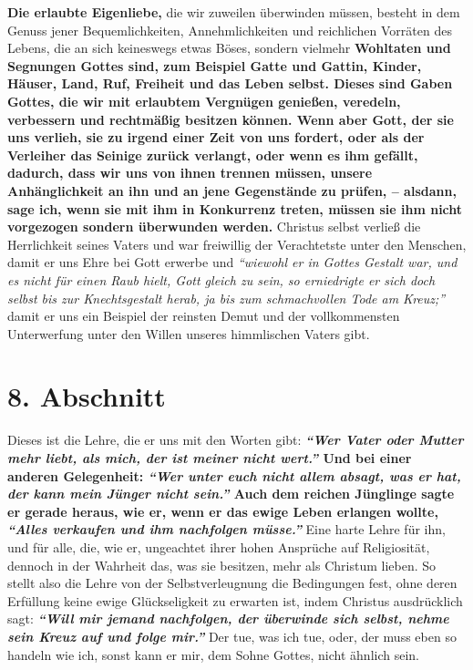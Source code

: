 \label{ref:04_07_vorteile}
\textbf{Die erlaubte Eigenliebe,} die wir zuweilen
überwinden müssen,
besteht in dem
Genuss jener Bequemlichkeiten, Annehmlichkeiten und reichlichen Vorräten des
Lebens, die an sich keineswegs etwas Böses, sondern vielmehr \textbf{Wohltaten
und
Segnungen Gottes sind, zum Beispiel Gatte und Gattin, Kinder, Häuser, Land, Ruf,
Freiheit und das Leben selbst. Dieses sind Gaben Gottes, die wir mit erlaubtem
Vergnügen genießen, veredeln, verbessern und rechtmäßig besitzen können. Wenn
aber Gott, der sie uns verlieh, sie zu irgend einer Zeit von uns fordert, oder
als der Verleiher das Seinige zurück verlangt, oder wenn es ihm gefällt,
dadurch, dass wir uns von ihnen trennen müssen, unsere Anhänglichkeit an ihn und
an jene Gegenstände zu prüfen, -- alsdann, sage ich, wenn sie mit ihm in
Konkurrenz treten,
müssen
sie ihm nicht vorgezogen sondern überwunden werden.}
Christus selbst verließ die Herrlichkeit seines Vaters und war freiwillig der
Verachtetste unter den Menschen, damit er uns Ehre bei Gott erwerbe und
\textit{"`wiewohl er in Gottes Gestalt war, und es nicht für einen Raub hielt,
Gott
gleich zu sein, so erniedrigte er sich doch selbst bis zur Knechtsgestalt
herab, ja bis zum schmachvollen Tode am Kreuz;"'}
damit er
uns ein Beispiel der reinsten Demut und der vollkommensten Unterwerfung unter
den Willen unseres himmlischen Vaters gibt.

\section{8. Abschnitt} \label{kap4_ab8}

Dieses ist die Lehre, die er uns mit den Worten gibt:
\textbf{
\textit{"`Wer Vater oder Mutter mehr liebt, als mich, der ist meiner nicht
wert."'}
Und bei einer anderen Gelegenheit:
\textit{"`Wer unter euch nicht allem absagt, was er hat, der kann mein Jünger
nicht sein."'} Auch dem reichen
Jünglinge sagte er gerade heraus, wie er, wenn er das ewige Leben erlangen
wollte,
\textit{"`Alles verkaufen und ihm nachfolgen müsse."'}
}
Eine harte Lehre für ihn, und für alle, die, wie er, ungeachtet ihrer hohen
Ansprüche auf Religiosität, dennoch in der Wahrheit das, was sie besitzen, mehr
als Christum lieben. So stellt also die Lehre von der Selbstverleugnung die
Bedingungen fest, ohne deren Erfüllung keine ewige Glückseligkeit zu erwarten
ist, indem Christus ausdrücklich sagt:
\textbf{
\textit{"`Will mir jemand nachfolgen, der überwinde sich selbst, nehme sein Kreuz auf und folge
mir."'}}
Der tue, was ich tue, oder, der muss eben so handeln wie ich, sonst kann
er mir, dem Sohne Gottes, nicht ähnlich sein.


